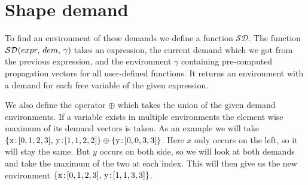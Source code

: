 \documentclass[../main.tex]{subfiles}
\begin{document}
\newpage
\section{Shape demand}
To find an environment of these demands we define a function $\mathcal{SD}$. The function $\mathcal{SD}\hspace{-1.2pt} \left( expr,\, dem,\, \gamma \right) \hspace{-1pt}$ takes an expression, the current demand which we got from the previous expression, and the environment $\gamma$ containing pre-computed propagation vectors for all user-defined functions. It returns an environment with a demand for each free variable of the given expression.

We also define the operator $\oplus$ which takes the union of the given demand environments. If a variable exists in multiple environments the element wise maximum of its demand vectors is taken. As an example we will take $\{ \text{x}\colon\hspace{-2pt}[0,1,2,3],\, \text{y}\colon\hspace{-2pt}[1,1,2,2] \} \oplus \{ \text{y}\colon\hspace{-2pt}[0,0,3,3] \}$. Here $x$ only occurs on the left, so it will stay the same. But $y$ occurs on both side, so we will look at both demands and take the maximum of the two at each index. This will then give us the new environment $\{ \text{x}\colon\hspace{-2pt}[0,1,2,3],\, \text{y}\colon\hspace{-2pt}[1,1,3,3] \}$.
\end{document}
